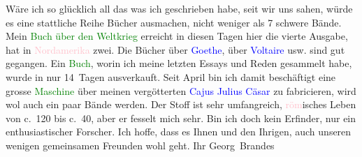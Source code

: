            \pstart
           Wäre ich so glücklich all das was ich geschrieben habe, seit wir uns sahen, würde
                    es eine stattliche Reihe Bücher ausmachen, nicht weniger als 7 schwere Bände.
                    Mein \textcolor{green}{Buch über den Weltkrieg}{}
                    erreicht in diesen Tagen hier die vierte Ausgabe, hat in \textcolor{pink}{Nordamerika}{}\ledrightnote{\textcolor{pink}{Amerika}} zwei. Die Bücher über \textcolor{green}{\textcolor{blue}{Goethe}{}\ledrightnote{\textcolor{blue}{Johann Wolfgang von Goethe}}}{}, über \textcolor{green}{\textcolor{blue}{Voltaire}{}\ledrightnote{\textcolor{blue}{Voltaire}}}{} usw. sind gut gegangen. Ein \textcolor{green}{Buch}{}, worin ich meine letzten Essays und Reden gesammelt habe, wurde
                        {\pb}in nur 14 Tagen
                    ausverkauft. Seit April bin ich damit beschäftigt eine grosse \textcolor{green}{Maschine}{} über meinen
                    vergötterten \textcolor{blue}{Cajus Julius Cäsar}{}\ledrightnote{\textcolor{blue}{Gaius Iulius Caesar}} zu
                    fabricieren, wird wol auch ein paar Bände werden. Der Stoff ist sehr
                    umfangreich, \textcolor{pink}{röm}{}\ledrightnote{\textcolor{pink}{Rom}}isches Leben von
                        c. 120 bis c. 40, aber er fesselt mich sehr. Bin
                    ich doch kein Erfinder, nur ein enthusiastischer Forscher. Ich hoffe, dass es
                    Ihnen und den Ihrigen, auch unseren wenigen gemeinsamen Freunden wohl geht. Ihr
                        \spacefill\mbox{Georg Brandes}\pend
           \endnumbering{}  
      